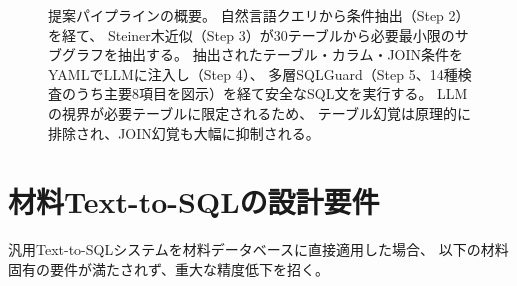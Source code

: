 \documentclass[5p,twocolumn]{elsarticle}
\begin{document}
\begin{figure}[htbp]
{%
}%
\caption{提案パイプラインの概要。
  自然言語クエリから条件抽出（Step 2）を経て、
  Steiner木近似（Step 3）が30テーブルから必要最小限のサブグラフを抽出する。
  抽出されたテーブル・カラム・JOIN条件をYAMLでLLMに注入し（Step 4）、
  多層SQLGuard（Step 5、14種検査のうち主要8項目を図示）を経て安全なSQL文を実行する。
  LLMの視界が必要テーブルに限定されるため、
  テーブル幻覚は原理的に排除され、JOIN幻覚も大幅に抑制される。}
\label{fig:step3_pipeline}
\end{figure}

\section{材料Text-to-SQLの設計要件}
\label{sec:design_requirements}

汎用Text-to-SQLシステムを材料データベースに直接適用した場合、
以下の材料固有の要件が満たされず、重大な精度低下を招く。
\end{document}
